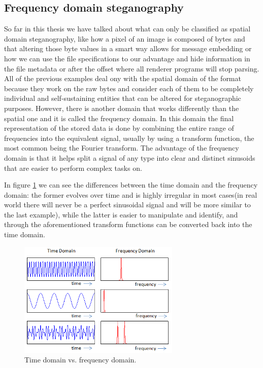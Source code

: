 \begin{multicols}{2}
\subsection{Frequency domain steganography}
So far in this thesis we have talked about what can only be classified as spatial domain steganography, like how a pixel of an image is composed of bytes and that altering those byte values in a smart way allows for message embedding or how we can use the file specifications to our advantage and hide information in the file metadata or after the offset where all renderer programs will stop parsing. All of the previous examples deal ony with the spatial domain of the format because they work on the raw bytes and consider each of them to be completely individual and self-sustaining entities that can be altered for steganographic purposes. However, there is another domain that works differently than the spatial one and it is called the frequency domain. In this domain the final representation of the stored data is done by combining the entire range of frequencies into the equivalent signal, usually by using a transform function, the most common being the Fourier transform. The advantage of the frequency domain is that it helps split a signal of any type into clear and distinct sinusoids that are easier to perform complex tasks on. 

In figure \ref{time_vs_frequency_comparison} we can see the differences between the time domain and the frequency domain: the former evolves over time and is highly irregular in most cases(in real world there will never be a perfect sinusoidal signal and will be more similar to the last example), while the latter is easier to manipulate and identify, and through the aforementioned transform functions can be converted back into the time domain.
\begin{figure}[H]
    \centering
    \includegraphics[width=7.7cm,keepaspectratio]{pics/audio_chapter/time_vs_frequency_domains.png}
    \caption{Time domain vs. frequency domain.}
    \label{time_vs_frequency_comparison}
\end{figure}


\end{multicols}
